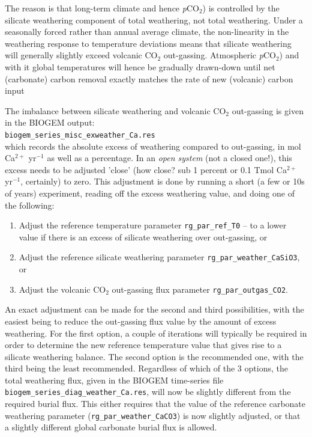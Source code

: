\documentclass[11pt,fleqn]{book} %
\begin{document}
The reason is that long-term climate and hence \textit{p}CO${_2}$) is controlled by the silicate weathering component of total weathering, not total weathering. Under a seasonally forced rather than annual average climate, the non-linearity in the weathering response to temperature deviations means that silicate weathering will generally slightly exceed volcanic CO$_{2}$ out-gassing. Atmospheric \textit{p}CO${_2}$) and with it  global temperatures will hence be gradually drawn-down until net (carbonate) carbon removal exactly matches the rate of new (volcanic) carbon input

The imbalance between silicate weathering and volcanic CO$_{2}$ out-gassing is given in the BIOGEM output:
\\\texttt{biogem\_series\_misc\_exweather\_Ca.res}
\\which records the absolute excess of weathering compared to out-gassing, in mol Ca$^{2+}$ yr$^{-1}$ as well as a percentage. In an \textit{open system} (not a closed one!), this excess needs to be adjusted 'close' (how close? sub 1 percent or 0.1 Tmol Ca$^{2+}$ yr$^{-1}$, certainly) to zero. This adjustment is done by running a short (a few or 10s of years) experiment, reading off the excess weathering value, and doing one of the following:

\begin{enumerate}
\item Adjust the reference temperature parameter \texttt{rg\_par\_ref\_T0} -- to a lower value if there is an excess of silicate weathering over out-gassing, or
\item Adjust the reference silicate weathering parameter \texttt{rg\_par\_weather\_CaSiO3}, or
\item Adjust the volcanic CO$_{2}$ out-gassing flux parameter \texttt{rg\_par\_outgas\_CO2}.
\end{enumerate}
An exact adjustment can be made for the second and third possibilities, with the easiest being to reduce the out-gassing flux value by the amount of excess weathering. For the first option, a couple of iterations will typically be required in order to determine the new reference temperature value that gives rise to a silicate weathering balance. The second option is the recommended one, with the third being the least recommended.
Regardless of which of the 3 options, the total weathering flux, given in the BIOGEM time-series file \texttt{biogem\_series\_diag\_weather\_Ca.res}, will now be slightly different from the required burial flux. This either requires that the value of the reference carbonate weathering parameter (\texttt{rg\_par\_weather\_CaCO3}) is now slightly adjusted, or that a slightly different global carbonate burial flux is allowed.
\end{document}
